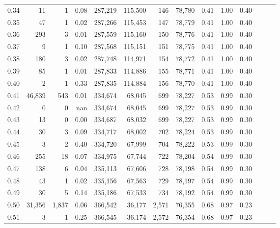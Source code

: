 \begin{tabular}{rrrrrrrrrrrrrr}
0.34 &      11 &       1 &  0.08 &  287,219 &  115,500 &     146 &  78,780 &  0.41 &  1.00 &      0.40 \\
0.35 &      47 &       1 &  0.02 &  287,266 &  115,453 &     147 &  78,779 &  0.41 &  1.00 &      0.40 \\
0.36 &     293 &       3 &  0.01 &  287,559 &  115,160 &     150 &  78,776 &  0.41 &  1.00 &      0.40 \\
0.37 &       9 &       1 &  0.10 &  287,568 &  115,151 &     151 &  78,775 &  0.41 &  1.00 &      0.40 \\
0.38 &     180 &       3 &  0.02 &  287,748 &  114,971 &     154 &  78,772 &  0.41 &  1.00 &      0.40 \\
0.39 &      85 &       1 &  0.01 &  287,833 &  114,886 &     155 &  78,771 &  0.41 &  1.00 &      0.40 \\
0.40 &       2 &       1 &  0.33 &  287,835 &  114,884 &     156 &  78,770 &  0.41 &  1.00 &      0.40 \\
0.41 &  46,839 &     543 &  0.01 &  334,674 &   68,045 &     699 &  78,227 &  0.53 &  0.99 &      0.30 \\
0.42 &       0 &       0 &   nan &  334,674 &   68,045 &     699 &  78,227 &  0.53 &  0.99 &      0.30 \\
0.43 &      13 &       0 &  0.00 &  334,687 &   68,032 &     699 &  78,227 &  0.53 &  0.99 &      0.30 \\
0.44 &      30 &       3 &  0.09 &  334,717 &   68,002 &     702 &  78,224 &  0.53 &  0.99 &      0.30 \\
0.45 &       3 &       2 &  0.40 &  334,720 &   67,999 &     704 &  78,222 &  0.53 &  0.99 &      0.30 \\
0.46 &     255 &      18 &  0.07 &  334,975 &   67,744 &     722 &  78,204 &  0.54 &  0.99 &      0.30 \\
0.47 &     138 &       6 &  0.04 &  335,113 &   67,606 &     728 &  78,198 &  0.54 &  0.99 &      0.30 \\
0.48 &      43 &       1 &  0.02 &  335,156 &   67,563 &     729 &  78,197 &  0.54 &  0.99 &      0.30 \\
0.49 &      30 &       5 &  0.14 &  335,186 &   67,533 &     734 &  78,192 &  0.54 &  0.99 &      0.30 \\
0.50 &  31,356 &   1,837 &  0.06 &  366,542 &   36,177 &   2,571 &  76,355 &  0.68 &  0.97 &      0.23 \\
0.51 &       3 &       1 &  0.25 &  366,545 &   36,174 &   2,572 &  76,354 &  0.68 &  0.97 &      0.23 \\

\end{tabular}
